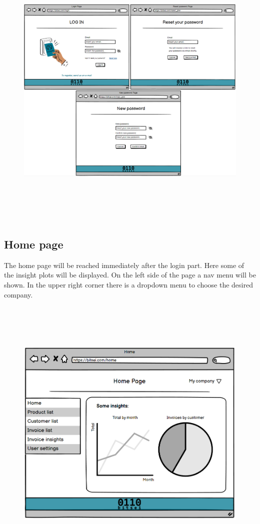 \begin{figure}[h!]
    \centering
    \includegraphics[height=390pt, keepaspectratio]{resources/mockup/Login.png}
\end{figure}
\newpage

\subsection{Home page}
The home page will be reached immediately after the login part. Here some of the insight plots will be displayed. On the left side of the page a nav menu will be shown. In the upper right corner there is a dropdown menu to choose the desired company.
\begin{figure}[h!]
    \centering
    \includegraphics[height=380pt, keepaspectratio]{resources/mockup/Home.png}
\end{figure}
\newpage
